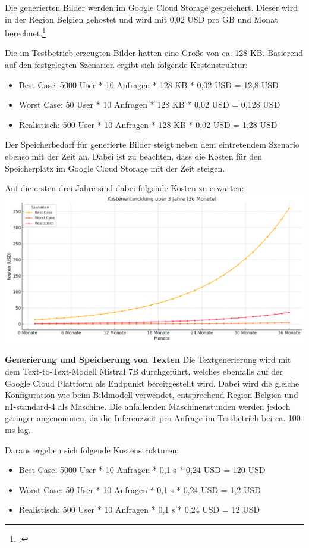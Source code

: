 Die generierten Bilder werden im Google Cloud Storage gespeichert.
Dieser wird in der Region Belgien gehostet und wird mit 0,02 USD pro GB und Monat berechnet.\footcite{GoogleCloudStorage2025}

Die im Testbetrieb erzeugten Bilder hatten eine Größe von ca. 128 KB.
Basierend auf den festgelegten Szenarien ergibt sich folgende Kostenstruktur:
\begin{itemize}
    \item Best Case: 5000 User * 10 Anfragen * 128 KB * 0,02 USD = 12,8 USD
    \item Worst Case: 50 User * 10 Anfragen * 128 KB * 0,02 USD = 0,128 USD
    \item Realistisch: 500 User * 10 Anfragen * 128 KB * 0,02 USD = 1,28 USD
\end{itemize}

Der Speicherbedarf für generierte Bilder steigt neben dem eintretendem Szenario ebenso mit der Zeit an.
Dabei ist zu beachten, dass die Kosten für den Speicherplatz im Google Cloud Storage mit der Zeit steigen.

Auf die ersten drei Jahre sind dabei folgende Kosten zu erwarten:
\includegraphics{abbildungen/KostenSpeicher}

\textbf{Generierung und Speicherung von Texten}
Die Textgenerierung wird mit dem Text-to-Text-Modell Mistral 7B durchgeführt, welches ebenfalls auf der Google Cloud Plattform als Endpunkt bereitgestellt wird.
Dabei wird die gleiche Konfiguration wie beim Bildmodell verwendet, entsprechend Region Belgien und n1-standard-4 als Maschine.
Die anfallenden Maschinenstunden werden jedoch geringer angenommen, da die Inferenzzeit pro Anfrage im Testbetrieb bei ca. 100 ms lag.

Daraus ergeben sich folgende Kostenstrukturen:
\begin{itemize}
    \item Best Case: 5000 User * 10 Anfragen * 0,1 s * 0,24 USD = 120 USD
    \item Worst Case: 50 User * 10 Anfragen * 0,1 s * 0,24 USD = 1,2 USD
    \item Realistisch: 500 User * 10 Anfragen * 0,1 s * 0,24 USD = 12 USD
\end{itemize}


